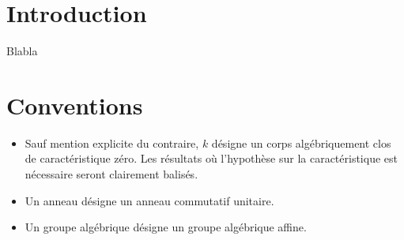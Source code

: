 
\chapter*{Introduction}

Blabla

\chapter*{Conventions}
\label{sec:conventions}

\begin{itemize}
\item Sauf mention explicite du contraire, $k$ désigne un corps algébriquement clos de caractéristique zéro. Les résultats où l'hypothèse sur la caractéristique est nécessaire seront clairement balisés.
\item Un anneau désigne un anneau commutatif unitaire.
\item Un groupe algébrique désigne un groupe algébrique affine.
\end{itemize}


